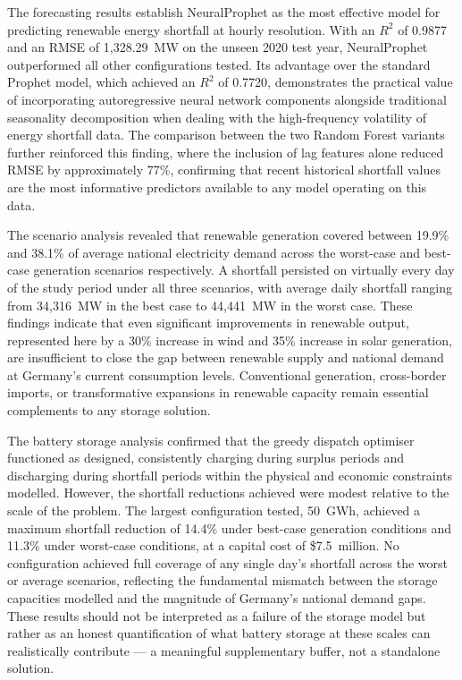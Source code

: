 \documentclass[conference]{IEEEtran}
\begin{document}
The forecasting results establish NeuralProphet as the most effective model for predicting renewable energy shortfall at hourly resolution. With an \(R^2\) of 0.9877 and an RMSE of 1{,}328.29~MW on the unseen 2020 test year, NeuralProphet outperformed all other configurations tested. Its advantage over the standard Prophet model, which achieved an \(R^2\) of 0.7720, demonstrates the practical value of incorporating autoregressive neural network components alongside traditional seasonality decomposition when dealing with the high-frequency volatility of energy shortfall data. The comparison between the two Random Forest variants further reinforced this finding, where the inclusion of lag features alone reduced RMSE by approximately 77\%, confirming that recent historical shortfall values are the most informative predictors available to any model operating on this data.
 
The scenario analysis revealed that renewable generation covered between 19.9\% and 38.1\% of average national electricity demand across the worst-case and best-case generation scenarios respectively. A shortfall persisted on virtually every day of the study period under all three scenarios, with average daily shortfall ranging from 34{,}316~MW in the best case to 44{,}441~MW in the worst case. These findings indicate that even significant improvements in renewable output, represented here by a 30\% increase in wind and 35\% increase in solar generation, are insufficient to close the gap between renewable supply and national demand at Germany's current consumption levels. Conventional generation, cross-border imports, or transformative expansions in renewable capacity remain essential complements to any storage solution.
 
The battery storage analysis confirmed that the greedy dispatch optimiser functioned as designed, consistently charging during surplus periods and discharging during shortfall periods within the physical and economic constraints modelled. However, the shortfall reductions achieved were modest relative to the scale of the problem. The largest configuration tested, 50~GWh, achieved a maximum shortfall reduction of 14.4\% under best-case generation conditions and 11.3\% under worst-case conditions, at a capital cost of \$7.5~million. No configuration achieved full coverage of any single day's shortfall across the worst or average scenarios, reflecting the fundamental mismatch between the storage capacities modelled and the magnitude of Germany's national demand gaps. These results should not be interpreted as a failure of the storage model but rather as an honest quantification of what battery storage at these scales can realistically contribute --- a meaningful supplementary buffer, not a standalone solution.
 
\end{document}
